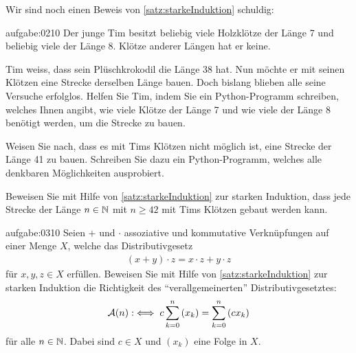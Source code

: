 \noindent
Wir sind noch einen Beweis von \cref{satz:starkeInduktion} schuldig:


\begin{aufgabe}{aufgabe:0210}
Der junge Tim besitzt beliebig viele Holzklötze der Länge 7 und beliebig viele der Länge 8. Klötze anderer Längen hat er keine.
\begin{aenum}
    \item Tim weiss, dass sein Plüschkrokodil die Länge 38 hat. Nun möchte er mit seinen Klötzen eine Strecke derselben Länge bauen. Doch bislang blieben alle seine Versuche erfolglos. Helfen Sie Tim, indem Sie ein Python-Programm schreiben, welches Ihnen angibt, wie viele Klötze der Länge 7 und wie viele der Länge 8 benötigt werden, um die Strecke zu bauen.
    \item Weisen Sie nach, dass es mit Tims Klötzen nicht möglich ist, eine Strecke der Länge 41 zu bauen. Schreiben Sie dazu ein Python-Programm, welches alle denkbaren Möglichkeiten ausprobiert.
    \item Beweisen Sie mit Hilfe von \cref{satz:starkeInduktion} zur starken Induktion, dass jede Strecke der Länge $n\in\mathbb{N}$ mit $n\geq 42$ mit Tims Klötzen gebaut werden kann.
\end{aenum}
\end{aufgabe}

\begin{aufgabe}{aufgabe:0310}
Seien $+$ und $\cdot$ assoziative und kommutative Verknüpfungen auf einer Menge $X$, welche das Distributivgesetz
\begin{align*}
    (x+y)\cdot z = x\cdot z + y\cdot z
\end{align*}
für $x,y,z\in X$ erfüllen. Beweisen Sie mit Hilfe von \cref{satz:starkeInduktion} zur starken Induktion die Richtigkeit des \enquote{verallgemeinerten} Distributivgesetztes:
\begin{align*}
    \mathcal{A}(n) :\iff c\sum_{k=0}^n\left(x_k\right) = \sum_{k=0}^n\left(cx_k\right)
\end{align*}
für alle $n\in\mathbb{N}$. Dabei sind $c\in X$ und $(x_k)$ eine Folge in $X$. 
\end{aufgabe}

